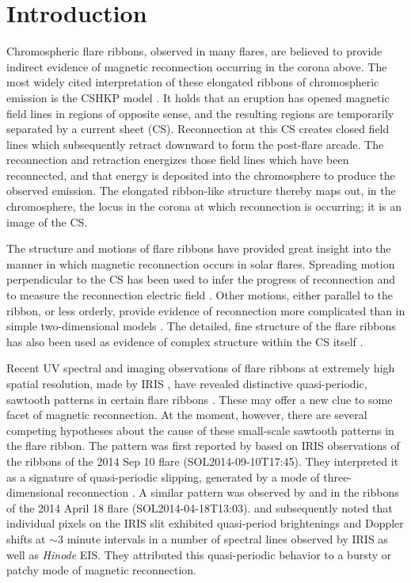 
\section{Introduction}

Chromospheric flare ribbons, observed in many flares, are believed to provide indirect evidence of magnetic reconnection occurring in the corona above.
The most widely cited interpretation of these elongated ribbons of chromospheric emission is the CSHKP model
\citep{Carmichael1964,Sturrock1968,Hirayama1974,Kopp1976}.  It holds that an eruption has opened magnetic field lines in regions of opposite sense, and the resulting regions are temporarily separated by a current sheet (CS).  Reconnection at this CS creates closed field lines which subsequently retract downward to form the post-flare arcade.  The reconnection and retraction energizes those field lines which have been reconnected, and that energy is deposited into the chromosphere to produce the observed emission.  The elongated ribbon-like structure thereby maps out, in the chromosphere, the locus in the corona at which reconnection is occurring; it is an image of the CS.

The structure and motions of flare ribbons have provided great insight into the manner in which magnetic reconnection occurs in solar flares.  Spreading motion perpendicular to the CS has been used to infer the progress of reconnection and to measure the reconnection electric field \citep{Forbes1984,Poletto1986,Qiu2002,Qiu2004,Isobe2005}.  Other motions, either parallel to the ribbon, or less orderly, provide evidence of reconnection more complicated than in simple two-dimensional models \citep{Warren2001,Fletcher2004,Qiu2009,Li2015}.  The detailed, fine structure of the flare ribbons has also been used as evidence of complex structure within the CS itself \citep{Nishizuka2009}.

Recent UV spectral and imaging observations of flare ribbons at extremely high spatial resolution, made by IRIS \citep{IRIS}, have revealed distinctive quasi-periodic, sawtooth patterns in certain flare ribbons \citep{Li2015,Brannon2015,Brosius2015,Brosius2016}.  These may offer a new clue to some facet of magnetic reconnection.  At the moment, however, there are several competing hypotheses about the cause of these small-scale
sawtooth patterns in the flare ribbon.  The pattern was first reported by \citet{Li2015} based on IRIS observations of the ribbons of the 2014 Sep 10 flare (SOL2014-09-10T17:45).  They interpreted it as a signature of quasi-periodic slipping, generated by a mode of three-dimensional reconnection \citep{Aulanier2006}.  A similar pattern was observed by \citet{Brannon2015} and \citet{Brosius2015} in the ribbons of the 2014 April 18 flare (SOL2014-04-18T13:03).  \citet{Brosius2015} and subsequently \citet{Brosius2016} noted that individual pixels on the IRIS slit exhibited quasi-period brightenings and Doppler shifts at $\sim 3$ minute intervals in a number of spectral lines observed by IRIS as well as {\em Hinode} EIS.  They attributed this quasi-periodic behavior to a bursty or patchy mode of magnetic reconnection.

